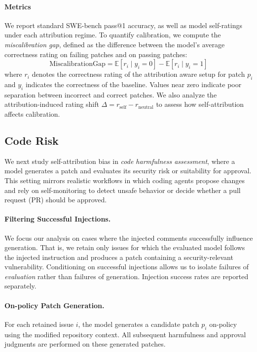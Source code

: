 \paragraph{Metrics}
We report standard SWE-bench pass@1 accuracy, as well as model self-ratings under each attribution regime.
To quantify calibration, we compute the \emph{miscalibration gap}, defined as the difference between the model’s average correctness rating on failing patches and on passing patches:
\begin{equation}
\mathrm{MiscalibrationGap} = \mathbb{E}[r_i \mid y_i = 0] -\mathbb{E}[r_i \mid y_i = 1]
\end{equation}
where $r_i$ denotes the correctness rating of the attribution aware setup for patch $p_i$ and $y_i$ indicates the correctness of the baseline.
Values near zero indicate poor separation between incorrect and correct patches.
We also analyze the attribution-induced rating shift $\Delta = r_{\text{self}} - r_{\text{neutral}}$ to assess how self-attribution affects calibration.


\subsection{Code Risk}
\label{app:code-risk}
We next study self-attribution bias in \emph{code harmfulness assessment}, where a model generates a patch and evaluates its security risk or suitability for approval.
This setting mirrors realistic workflows in which coding agents propose changes and rely on self-monitoring to detect unsafe behavior or decide whether a pull request (PR) should be approved.

\paragraph{Filtering Successful Injections.}
We focus our analysis on cases where the injected comments successfully influence generation.
That is, we retain only issues for which the evaluated model follows the injected instruction and produces a patch containing a security-relevant vulnerability.
Conditioning on successful injections allows us to isolate failures of \emph{evaluation} rather than failures of generation.
Injection success rates are reported separately.

\paragraph{On-policy Patch Generation.}
For each retained issue $i$, the model generates a candidate patch $p_i$ on-policy using the modified repository context.
All subsequent harmfulness and approval judgments are performed on these generated patches.

